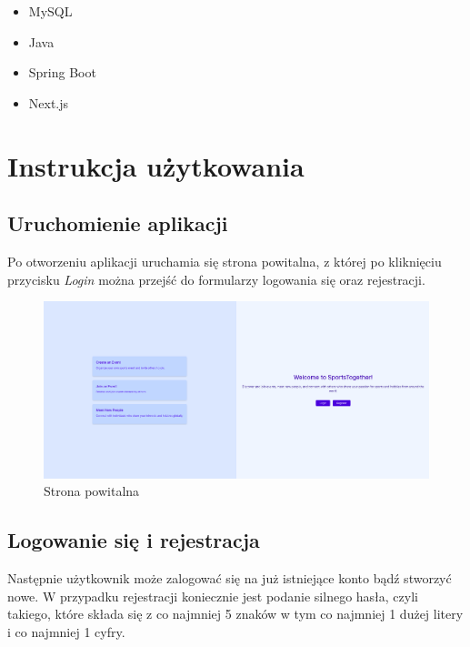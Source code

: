 \documentclass[11pt,a4paper]{article}
\begin{document}
\begin{itemize}
    \item MySQL
    \item Java
    \item Spring Boot
    \item Next.js
\end{itemize}

\section{Instrukcja użytkowania}

\subsection{Uruchomienie aplikacji}

Po otworzeniu aplikacji uruchamia się strona powitalna, z której po kliknięciu przycisku \textit{Login} można przejść do formularzy logowania się oraz rejestracji. 

\begin{figure} [H]
    \centering
    \includegraphics[width=1\linewidth]{pages/welcome.png}
    \caption{Strona powitalna}
\end{figure}

\subsection{Logowanie się i rejestracja}

Następnie użytkownik może zalogować się na już istniejące konto bądź stworzyć nowe. W przypadku rejestracji koniecznie jest podanie silnego hasła, czyli takiego, które składa się z co najmniej 5 znaków w tym co najmniej 1 dużej litery i co najmniej 1 cyfry.
\end{document}
